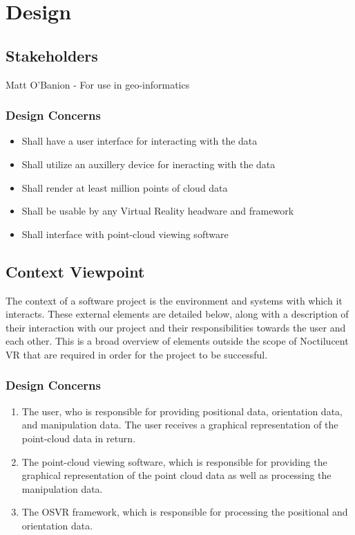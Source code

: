 \documentclass{article}
\begin{document}
\section{Design}

\subsection{Stakeholders}

Matt O'Banion - For use in geo-informatics

\subsubsection{Design Concerns}

\begin{itemize}
 \item Shall have a user interface for interacting with the data
 \item Shall utilize an auxillery device for ineracting with the data
 \item Shall render at least million points of cloud data
 \item Shall be usable by any Virtual Reality headware and framework
 \item Shall interface with point-cloud viewing software
\end{itemize}

\subsection{Context Viewpoint}

The context of a software project is the environment and systems with which it interacts. 
These external elements are detailed below, along with a description of their interaction with our project and their responsibilities towards the user and each other. 
This is a broad overview of elements outside the scope of Noctilucent VR that are required in order for the project to be successful. 

\subsubsection{Design Concerns}

\begin{enumerate}
\item The user, who is responsible for providing positional data, orientation data, and manipulation data. 
The user receives a graphical representation of the point-cloud data in return.
\item The point-cloud viewing software, which is responsible for providing the graphical representation of the point cloud data as well as processing the manipulation data.
\item The OSVR framework, which is responsible for processing the positional and orientation data.  
\end{enumerate}
\end{document}
